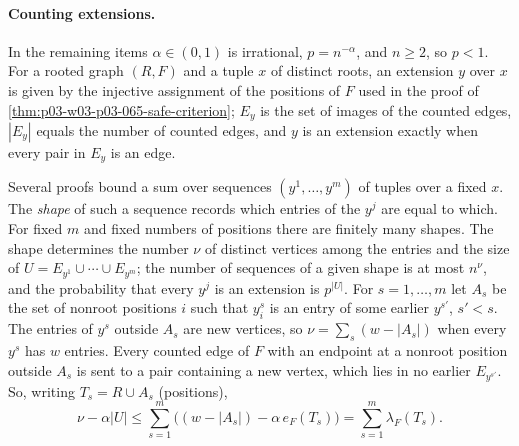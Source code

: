 \paragraph{Counting extensions.}

In the remaining items \(\alpha\in(0,1)\) is irrational, \(p=n^{-\alpha}\),
and \(n\geq2\), so \(p<1\).  For a rooted graph \((R,F)\) and a tuple \(x\)
of distinct roots, an extension \(y\) over \(x\) is given by the injective
assignment of the positions of \(F\) used in the proof of
\cref{thm:p03-w03-p03-065-safe-criterion}; \(E_y\) is the set of images of
the counted edges, \(|E_y|\) equals the number of counted edges, and \(y\) is
an extension exactly when every pair in \(E_y\) is an edge.

Several proofs bound a sum over sequences \((y^1,\ldots,y^m)\) of tuples over
a fixed \(x\).  The \emph{shape} of such a sequence records which entries of
the \(y^j\) are equal to which.  For fixed \(m\) and fixed numbers of
positions there are finitely many shapes.  The shape determines the number
\(\nu\) of distinct vertices among the entries and the size of
\(U=E_{y^1}\cup\cdots\cup E_{y^m}\); the number of sequences of a given shape
is at most \(n^{\nu}\), and the probability that every \(y^j\) is an
extension is \(p^{|U|}\).  For \(s=1,\ldots,m\) let \(A_s\) be the set of
nonroot positions \(i\) such that \(y^s_i\) is an entry of some earlier
\(y^{s'}\), \(s'<s\).  The entries of \(y^s\) outside \(A_s\) are new
vertices, so \(\nu=\sum_s(w-|A_s|)\) when every \(y^s\) has \(w\) entries.
Every counted edge of \(F\) with an endpoint at a nonroot position outside
\(A_s\) is sent to a pair containing a new vertex, which lies in no earlier
\(E_{y^{s'}}\).  So, writing \(T_s=R\cup A_s\) (positions),
\[
  \nu-\alpha|U|\leq\sum_{s=1}^m\bigl((w-|A_s|)-\alpha\,e_F(T_s)\bigr)
  =\sum_{s=1}^m\lambda_F(T_s).
  \tag{\(\ast\)}
\]

